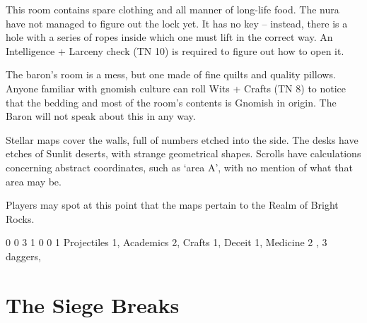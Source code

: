 \begin{multicols}{2}

This room contains spare clothing and all manner of long-life food.
The nura have not managed to figure out the lock yet.
It has no key -- instead, there is a hole with a series of ropes inside which one must lift in the correct way.
An Intelligence + Larceny check (TN 10) is required to figure out how to open it.


The baron's room is a mess, but one made of fine quilts and quality pillows.
Anyone familiar with gnomish culture can roll Wits + Crafts (TN 8) to notice that the bedding and most of the room's contents is Gnomish in origin.
The Baron will not speak about this in any way.


\begin{boxtext}

	Stellar maps cover the walls, full of numbers etched into the side.
	The desks have etches of Sunlit deserts, with strange geometrical shapes.
	Scrolls have calculations concerning abstract coordinates, such as `area A', with no mention of what that area may be.

\end{boxtext}

Players may spot at this point that the maps pertain to the Realm of Bright Rocks.


{0}%
{0}%
{{3}%
{1}%
{0}}%
{0}%
{1}%
{Projectiles 1, Academics 2, Crafts 1, Deceit 1, Medicine 2
}%
{\shortsword, 3 daggers, \partialleather}%
{}

\end{multicols}

\section{The Siege Breaks}
\label{siege}

\begin{multicols}{2}

\end{multicols}
